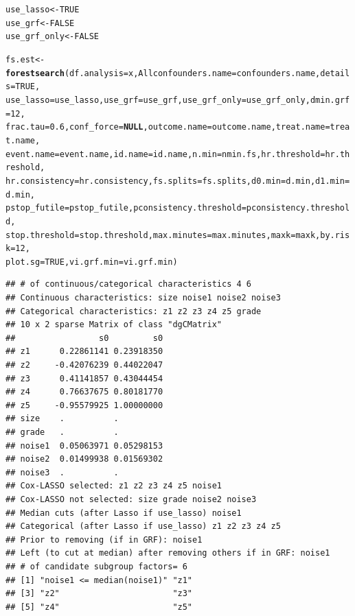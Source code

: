 \documentclass[smallextended]{svjour3}
\makeatletter
\newcommand{\hlnum}[1]{\textcolor[rgb]{0.686,0.059,0.569}{#1}}%
\newcommand{\hlstd}[1]{\textcolor[rgb]{0.345,0.345,0.345}{#1}}%
\newcommand{\hlkwa}[1]{\textcolor[rgb]{0.161,0.373,0.58}{\textbf{#1}}}%
\newcommand{\hlkwb}[1]{\textcolor[rgb]{0.69,0.353,0.396}{#1}}%
\newcommand{\hlkwc}[1]{\textcolor[rgb]{0.333,0.667,0.333}{#1}}%
\newcommand{\hlkwd}[1]{\textcolor[rgb]{0.737,0.353,0.396}{\textbf{#1}}}%
\newenvironment{kframe}{%
 \def\at@end@of@kframe{}%
 \ifinner\ifhmode%
  \def\at@end@of@kframe{\end{minipage}}%
  \begin{minipage}{\columnwidth}%
 \fi\fi%
 \def\FrameCommand##1{\hskip\@totalleftmargin \hskip-\fboxsep
 \colorbox{shadecolor}{##1}\hskip-\fboxsep
     \hskip-\linewidth \hskip-\@totalleftmargin \hskip\columnwidth}%
 \MakeFramed {\advance\hsize-\width
   \@totalleftmargin\z@ \linewidth\hsize
   \@setminipage}}%
 {\par\unskip\endMakeFramed%
 \at@end@of@kframe}
\newenvironment{knitrout}{}{} %
\makeatother
\begin{document}
\begin{knitrout}
\begin{kframe}
\begin{alltt}
\hlstd{use_lasso} \hlkwb{<-} \hlnum{TRUE}
\hlstd{use_grf} \hlkwb{<-} \hlnum{FALSE}
\hlstd{use_grf_only} \hlkwb{<-} \hlnum{FALSE}

\hlstd{fs.est} \hlkwb{<-} \hlkwd{forestsearch}\hlstd{(}\hlkwc{df.analysis} \hlstd{= x,} \hlkwc{Allconfounders.name} \hlstd{= confounders.name,} \hlkwc{details} \hlstd{=} \hlnum{TRUE}\hlstd{,}
    \hlkwc{use_lasso} \hlstd{= use_lasso,} \hlkwc{use_grf} \hlstd{= use_grf,} \hlkwc{use_grf_only} \hlstd{= use_grf_only,} \hlkwc{dmin.grf} \hlstd{=} \hlnum{12}\hlstd{,}
    \hlkwc{frac.tau} \hlstd{=} \hlnum{0.6}\hlstd{,} \hlkwc{conf_force} \hlstd{=} \hlkwa{NULL}\hlstd{,} \hlkwc{outcome.name} \hlstd{= outcome.name,} \hlkwc{treat.name} \hlstd{= treat.name,}
    \hlkwc{event.name} \hlstd{= event.name,} \hlkwc{id.name} \hlstd{= id.name,} \hlkwc{n.min} \hlstd{= nmin.fs,} \hlkwc{hr.threshold} \hlstd{= hr.threshold,}
    \hlkwc{hr.consistency} \hlstd{= hr.consistency,} \hlkwc{fs.splits} \hlstd{= fs.splits,} \hlkwc{d0.min} \hlstd{= d.min,} \hlkwc{d1.min} \hlstd{= d.min,}
    \hlkwc{pstop_futile} \hlstd{= pstop_futile,} \hlkwc{pconsistency.threshold} \hlstd{= pconsistency.threshold,}
    \hlkwc{stop.threshold} \hlstd{= stop.threshold,} \hlkwc{max.minutes} \hlstd{= max.minutes,} \hlkwc{maxk} \hlstd{= maxk,} \hlkwc{by.risk} \hlstd{=} \hlnum{12}\hlstd{,}
    \hlkwc{plot.sg} \hlstd{=} \hlnum{TRUE}\hlstd{,} \hlkwc{vi.grf.min} \hlstd{= vi.grf.min)}
\end{alltt}
\begin{verbatim}
## # of continuous/categorical characteristics 4 6 
## Continuous characteristics: size noise1 noise2 noise3 
## Categorical characteristics: z1 z2 z3 z4 z5 grade 
## 10 x 2 sparse Matrix of class "dgCMatrix"
##                 s0         s0
## z1      0.22861141 0.23918350
## z2     -0.42076239 0.44022047
## z3      0.41141857 0.43044454
## z4      0.76637675 0.80181770
## z5     -0.95579925 1.00000000
## size    .          .         
## grade   .          .         
## noise1  0.05063971 0.05298153
## noise2  0.01499938 0.01569302
## noise3  .          .         
## Cox-LASSO selected: z1 z2 z3 z4 z5 noise1 
## Cox-LASSO not selected: size grade noise2 noise3 
## Median cuts (after Lasso if use_lasso) noise1 
## Categorical (after Lasso if use_lasso) z1 z2 z3 z4 z5 
## Prior to removing (if in GRF): noise1 
## Left (to cut at median) after removing others if in GRF: noise1 
## # of candidate subgroup factors= 6 
## [1] "noise1 <= median(noise1)" "z1"                      
## [3] "z2"                       "z3"                      
## [5] "z4"                       "z5"                      

\end{verbatim}
\end{kframe}
\end{knitrout}
\end{document}
